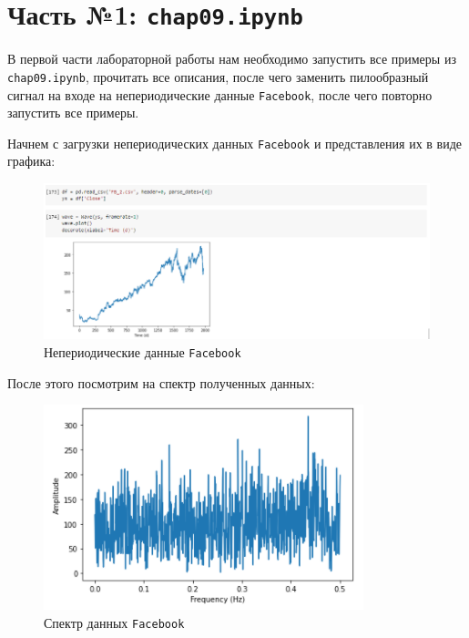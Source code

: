 \documentclass[a4paper]{article}
\begin{document}
    \newpage
        \section{Часть №1: \texttt{chap09.ipynb}}
            В первой части лабораторной работы нам необходимо запустить все примеры из \texttt{chap09.ipynb}, прочитать все описания, после чего заменить пилообразный сигнал на входе на непериодические данные \texttt{Facebook}, после чего повторно запустить все примеры.
            
            Начнем с загрузки непериодических данных \texttt{Facebook} и представления их в виде графика:
            
            \begin{figure}[H]
                \centering
                \includegraphics[width=\textwidth]{ex_1_new_wave.png}
                \caption{Непериодические данные \texttt{Facebook}}
                \label{fig:ex_1_new_wave}
            \end{figure}
            
            После этого посмотрим на спектр полученных данных:
            
            \begin{figure}[H]
                \centering
                \includegraphics{ex_1_new_spectr.png}
                \caption{Спектр данных \texttt{Facebook}}
                \label{fig:ex_1_new_spectr}
            \end{figure}
            
\end{document}
